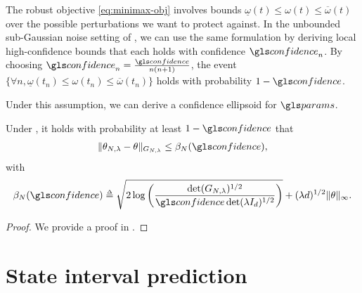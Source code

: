 \begin{remark}
	\begin{leftbar}[remarkbar]
		The robust objective \eqref{eq:minimax-obj} involves bounds $\underline{\omega}(t)\leq \omega(t) \leq \overline{\omega}(t)$ over the possible perturbations we want to protect against. In the unbounded sub-Gaussian noise setting of , we can use the same formulation by deriving local high-confidence bounds that each holds with confidence $\confidence_n$. By choosing $\confidence_n = \frac{\confidence}{n(n+1)}$, the event $\{\forall n, \underline{\omega}(t_n) \leq \omega(t_n) \leq \overline{\omega}(t_n)\}$ holds with probability $1-\confidence$.
	\end{leftbar}
\end{remark}

Under this assumption, we can derive a confidence ellipsoid for $\params$.

\begin{theorem}
	\label{thm:confidence_ellipsoid}
	\begin{leftbar}[theorembar]
	Under , it holds with probability at least $1-\confidence$ that
	\begin{align}
	\label{eq:confidence-ellipsoid}
	\| \theta_{N,\lambda}  - \theta\|_{G_{N,\lambda}} \leq \beta_N(\confidence),
	\end{align}
	with
	\begin{equation}
	\label{eq:beta_n}
	\beta_N(\confidence)\eqdef \sqrt{2\log \left(\frac{\det(G_{N,\lambda})^{1/2}}{\confidence\det(\lambda I_d)^{1/2}}\right)}
	+ (\lambda d)^{1/2}\|\theta\|_\infty.
	\end{equation}
	\end{leftbar}
\end{theorem}
\begin{proof}
	We provide a proof in .
\end{proof}

\section{State interval prediction}

\label{sec:prediction}


